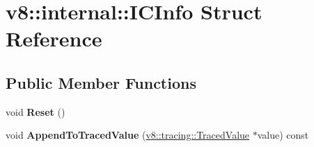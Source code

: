 \hypertarget{structv8_1_1internal_1_1ICInfo}{}\section{v8\+:\+:internal\+:\+:I\+C\+Info Struct Reference}
\label{structv8_1_1internal_1_1ICInfo}
\subsection*{Public Member Functions}
\begin{DoxyCompactItemize}
\item 
\mbox{\label{structv8_1_1internal_1_1ICInfo_a8df54af0ca83c6cb93c488a5c4006324}} 
void {\bfseries Reset} ()
\item 
\mbox{\label{structv8_1_1internal_1_1ICInfo_ac703fc7fb4f851a5f557fa15b76481b6}} 
void {\bfseries Append\+To\+Traced\+Value} (\mbox{\hyperlink{classv8_1_1tracing_1_1TracedValue}{v8\+::tracing\+::\+Traced\+Value}} $\ast$value) const
\end{DoxyCompactItemize}
